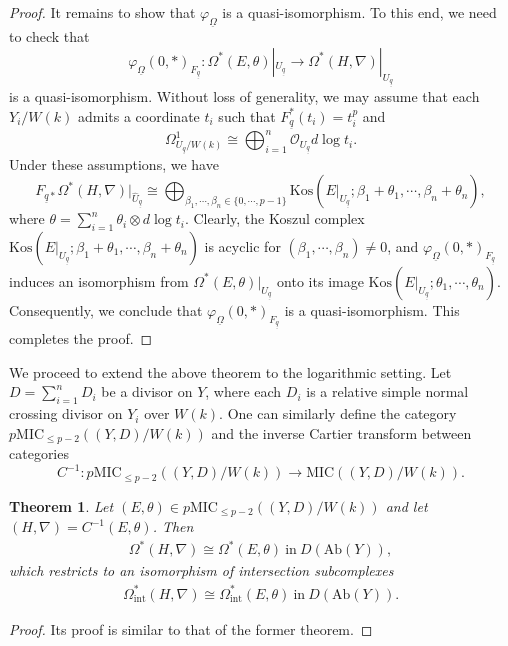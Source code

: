 \documentclass[12pt, a4paper]{article}
\newtheorem{theorem}{Theorem}[section]
\begin{document}
\begin{proof}
It remains to show that $\varphi_{\underline{\Omega}}$ is a quasi-isomorphism. To this end, we need to check that
$$
\varphi_{\underline\Omega}(0,*)_{F_{\underline q}}:\Omega^*(E,\theta)|_{U_{\underline q}}\to\Omega^*(H,\nabla)|_{U_{\underline q}}
$$
is a quasi-isomorphism. Without loss of generality, we may assume that each 
$Y_i/W(k)$ admits a coordinate $t_i$ such that
$F^*_{\underline q}(t_i)=t_i^p$ and
$$
\Omega^1_{U_{\underline q}/W(k)}\cong\bigoplus_{i=1}^n\mathcal O_{U_{\underline q}}d\log t_i.
$$ 
Under these assumptions, we have
$$
F_{\underline q*}\Omega^*(H,\nabla)|_{\hat U_{\underline q}}\cong\bigoplus_{\beta_1,\cdots,\beta_n\in\{0,\cdots,p-1\}}\mathrm{Kos}(E|_{U_{\underline q}};\beta_1+\theta_1,\cdots,\beta_n+\theta_n),
$$
where $\theta=\sum_{i=1}^n\theta_i\otimes d\log t_i$.
Clearly, the Koszul complex $\mathrm{Kos}(E|_{U_{\underline q}};\beta_1+\theta_1,\cdots,\beta_n+\theta_n)$ is acyclic for $(\beta_1,\cdots,\beta_n)\neq0$, and $\varphi_{\underline\Omega}(0,*)_{F_{\underline q}}$ induces an isomorphism from $\Omega^*(E,\theta)|_{ U_{\underline q}}$ onto its image $\mathrm{Kos}(E|_{U_{\underline q}};\theta_1,\cdots,\theta_n)$. Consequently, we conclude that $\varphi_{\underline\Omega}(0,*)_{F_{\underline q}}$ is a quasi-isomorphism. This completes the proof.
\end{proof}



We proceed to extend the above theorem to the logarithmic setting. Let $D = \sum_{i=1}^n D_i$ be a divisor on $Y$, where each $D_i$ is a relative simple normal crossing divisor on $Y_i$ over $W(k)$. One can similarly define the category $p\mathrm{MIC}_{\leq p-2}((Y,D)/W(k))$ and the inverse Cartier transform between categories
$$
C^{-1}:p\mathrm{MIC}_{\leq p-2}((Y,D)/W(k))\to\mathrm{MIC}((Y,D)/W(k)).
$$

\begin{theorem}
Let $(E,\theta)\in p\mathrm{MIC}_{\leq p-2}((Y,D)/W(k))$ and let $(H,\nabla)=C^{-1}(E,\theta)$. Then 
\begin{eqnarray}\label{log de Rham-p}
\Omega^*(H,\nabla)\cong\Omega^*(E,\theta)~\mathrm{in}~D(\mathrm{Ab}(Y)),
\end{eqnarray}
which restricts to an isomorphism of intersection subcomplexes
\begin{eqnarray}\label{int de Rham-p}
\Omega_\mathrm{int}^*(H,\nabla)\cong\Omega_\mathrm{int}^*(E,\theta)~\mathrm{in}~D(\mathrm{Ab}(Y)).
\end{eqnarray}
\end{theorem}
\begin{proof}
Its proof is similar to that of the former theorem.
\end{proof}
\end{document}
